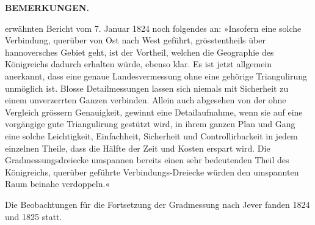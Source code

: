 \par\clearpage
\noindent{}\hfill\textbf{BEMERKUNGEN.}\hfill\null\par\medskip
\noindent erwähnten Bericht vom 7. Januar 1824 noch folgendes an: »Insofern eine solche Verbindung, querüber von Ost nach West geführt, grösstentheils über hannoversches Gebiet geht, ist der Vortheil, welchen die Geographie des Königreichs dadurch erhalten würde, ebenso klar. Es ist jetzt allgemein anerkannt, dass eine genaue Landesvermessung ohne eine gehörige Triangulirung unmöglich ist. Blosse Detailmessungen lassen sich niemals mit Sicherheit zu einem unverzerrten Ganzen verbinden. Allein auch abgesehen von der ohne Vergleich grössern Genauigkeit, gewinnt eine Detailaufnahme, wenn sie auf eine vorgängige gute Triangulirung gestützt wird, in ihrem ganzen Plan und Gang eine solche Leichtigkeit, Einfachheit, Sicherheit und Controllirbarkeit in jedem einzelnen Theile, dass die Hälfte der Zeit und Kosten erspart wird. Die Gradmessungsdreiecke umspannen bereits einen sehr bedeutenden Theil des Königreichs, querüber geführte Verbindungs-Dreiecke würden den umspannten Raum beinahe verdoppeln.«

\par\noindent\hspace*{\parindent}Die Beobachtungen für die Fortsetzung der Gradmessung nach Jever fanden 1824 und 1825 statt.

